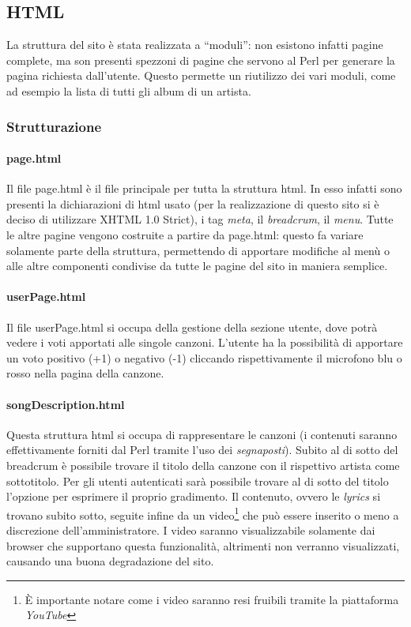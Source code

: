 \subsection{HTML}
La struttura del sito \`e stata realizzata a ``moduli'': non esistono infatti pagine complete, ma son presenti spezzoni di pagine che servono al Perl per generare la pagina richiesta dall'utente. Questo permette un riutilizzo dei vari moduli, come ad esempio la lista di tutti gli album di un artista.
\subsubsection{Strutturazione}
\paragraph*{page.html} Il file page.html \`e il file principale per tutta la struttura html. In esso infatti sono presenti la dichiarazioni di html usato (per la realizzazione di questo sito si \`e deciso di utilizzare XHTML 1.0 Strict), i tag \textit{meta}, il \textit{breadcrum}, il \textit{menu}. Tutte le altre pagine vengono costruite a partire da page.html: questo fa variare solamente parte della struttura, permettendo di apportare modifiche al men\`u o alle altre componenti condivise da tutte le pagine del sito in maniera semplice.

\paragraph*{userPage.html} Il file userPage.html si occupa della gestione della sezione utente, dove potrà vedere i voti apportati alle singole canzoni. L'utente ha la possibilità di apportare un voto positivo (+1) o negativo (-1) cliccando rispettivamente il microfono blu o rosso nella pagina della canzone.

\paragraph*{songDescription.html} Questa struttura html si occupa di rappresentare le canzoni (i contenuti saranno effettivamente forniti dal Perl tramite l'uso dei \textit{segnaposti}). Subito al di sotto del breadcrum è possibile trovare il titolo della canzone con il rispettivo artista come sottotitolo. Per gli utenti autenticati sarà possibile trovare al di sotto del titolo l'opzione per esprimere il proprio gradimento. Il contenuto, ovvero le \textit{lyrics} si trovano subito sotto, seguite infine da un video\footnote{È importante notare come i video saranno resi fruibili tramite la piattaforma \textit{YouTube}} che può essere inserito o meno a discrezione dell'amministratore. I video saranno visualizzabile solamente dai browser che supportano questa funzionalità, altrimenti non verranno visualizzati, causando una buona degradazione del sito.

